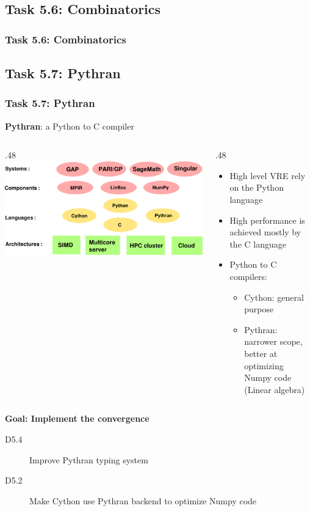 \documentclass{beamer}
\begin{document}
\subsection{Task 5.6: Combinatorics}
\begin{frame}
  \frametitle{Task 5.6: Combinatorics}
\end{frame}
\subsection{Task 5.7: Pythran}
\begin{frame}
  \frametitle{Task 5.7: Pythran}
  \begin{center}
    {\Large \textbf{Pythran}: a Python to C compiler}
  \end{center}
  \begin{columns}
    \begin{column}
      {.48\textwidth }
          \includegraphics[width=\textwidth]{software_stack}
    \end{column}
    \begin{column}
      {.48\textwidth }
  \begin{itemize}
  \item High level VRE rely on the Python language
  \item High performance is achieved mostly by the C language\pause
  \item Python to C compilers: 
    \begin{itemize}
    \item Cython: general purpose
    \item Pythran: narrower scope, better at optimizing Numpy code (Linear
      algebra)
    \end{itemize}
  \end{itemize}
    \end{column}
  \end{columns}
\pause
  \begin{center}
    \textbf{Goal: Implement the convergence}

    \begin{description}
      \item[D5.4] Improve Pythran typing system
      \item[D5.2] Make Cython use Pythran backend to optimize Numpy code
    \end{description}
  \end{center}
  
\end{frame}
\end{document}

